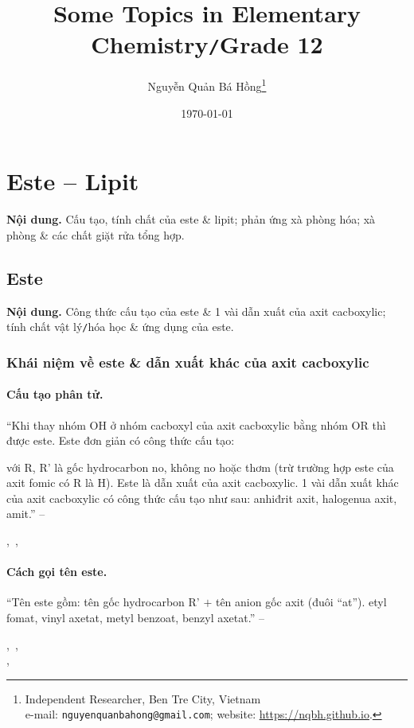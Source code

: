 \documentclass{article}
\title{Some Topics in Elementary Chemistry\texttt{/}Grade 12}
\author{Nguyễn Quản Bá Hồng\footnote{Independent Researcher, Ben Tre City, Vietnam\\e-mail: \texttt{nguyenquanbahong@gmail.com}; website: \url{https://nqbh.github.io}.}}
\date{\today}
\numberwithin{equation}{section}
\begin{document}
\maketitle
\begin{abstract}
	
\end{abstract}
\setcounter{secnumdepth}{4}
\setcounter{tocdepth}{3}
\tableofcontents
\newpage


\section{Este -- Lipit}
\textsf{\textbf{Nội dung.} Cấu tạo, tính chất của este \& lipit; phản ứng xà phòng hóa; xà phòng \& các chất giặt rửa tổng hợp.}

\subsection{Este}
\textsf{\textbf{Nội dung.} Công thức cấu tạo của este \& 1 vài dẫn xuất của axit cacboxylic; tính chất vật lý\texttt{/}hóa học \& ứng dụng của este.}

\subsubsection{Khái niệm về este \& dẫn xuất khác của axit cacboxylic}

\paragraph{Cấu tạo phân tử.} ``Khi thay nhóm OH ở nhóm cacboxyl của axit cacboxylic bằng nhóm OR thì được este. Este đơn giản có công thức cấu tạo:
\begin{center}
\end{center}
với R, R' là gốc hydrocarbon no, không no hoặc thơm (trừ trường hợp este của axit fomic có R là H). Este là dẫn xuất của axit cacboxylic. 1 vài dẫn xuất khác của axit cacboxylic có công thức cấu tạo như sau: anhiđrit axit, halogenua axit, amit.'' -- \cite[p. 4]{SGK_Hoa_Hoc_12_nang_cao}
\begin{center}
	,\ ,\ 
\end{center}

\paragraph{Cách gọi tên este.} ``Tên este gồm: tên gốc hydrocarbon R' $+$ tên anion gốc axit (đuôi ``at''). etyl fomat, vinyl axetat, metyl benzoat, benzyl axetat.'' -- \cite[p. 4]{SGK_Hoa_Hoc_12_nang_cao}
\begin{center}
	,\ ,\\,\ 
\end{center}
\end{document}
